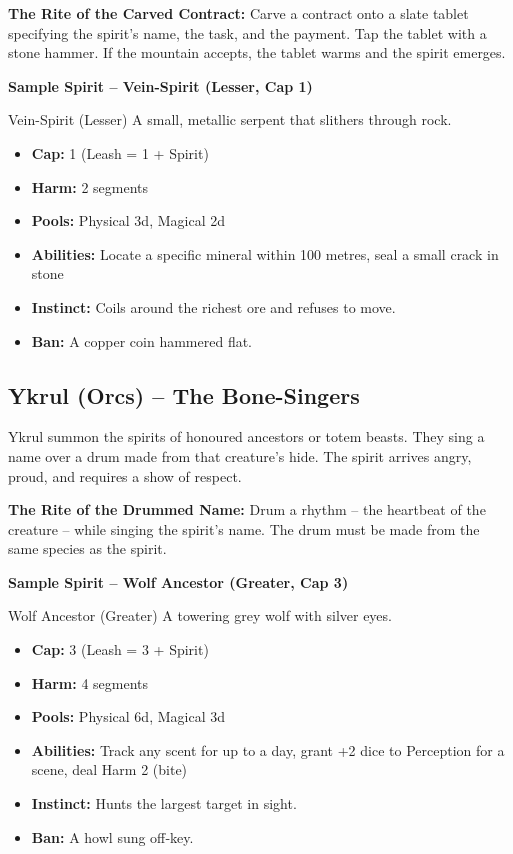 \documentclass[10pt,a5paper]{book}
\begin{document}
\textbf{The Rite of the Carved Contract:} Carve a contract onto a slate tablet specifying the spirit's name, the task, and the payment. Tap the tablet with a stone hammer. If the mountain accepts, the tablet warms and the spirit emerges.

\textbf{Sample Spirit -- Vein-Spirit (Lesser, Cap 1)}
\begin{spiritcard}{Vein-Spirit (Lesser)}
A small, metallic serpent that slithers through rock.
\begin{itemize}
    \item \textbf{Cap:} 1 (Leash = 1 + Spirit)
    \item \textbf{Harm:} 2 segments
    \item \textbf{Pools:} Physical 3d, Magical 2d
    \item \textbf{Abilities:} Locate a specific mineral within 100 metres, seal a small crack in stone
    \item \textbf{Instinct:} Coils around the richest ore and refuses to move.
    \item \textbf{Ban:} A copper coin hammered flat.
\end{itemize}
\end{spiritcard}

\subsection{Ykrul (Orcs) -- The Bone-Singers}
Ykrul summon the spirits of honoured ancestors or totem beasts. They sing a name over a drum made from that creature's hide. The spirit arrives angry, proud, and requires a show of respect.

\textbf{The Rite of the Drummed Name:} Drum a rhythm -- the heartbeat of the creature -- while singing the spirit's name. The drum must be made from the same species as the spirit.

\textbf{Sample Spirit -- Wolf Ancestor (Greater, Cap 3)}
\begin{spiritcard}{Wolf Ancestor (Greater)}
A towering grey wolf with silver eyes.
\begin{itemize}
    \item \textbf{Cap:} 3 (Leash = 3 + Spirit)
    \item \textbf{Harm:} 4 segments
    \item \textbf{Pools:} Physical 6d, Magical 3d
    \item \textbf{Abilities:} Track any scent for up to a day, grant +2 dice to Perception for a scene, deal Harm 2 (bite)
    \item \textbf{Instinct:} Hunts the largest target in sight.
    \item \textbf{Ban:} A howl sung off‑key.
\end{itemize}
\end{spiritcard}
\end{document}
